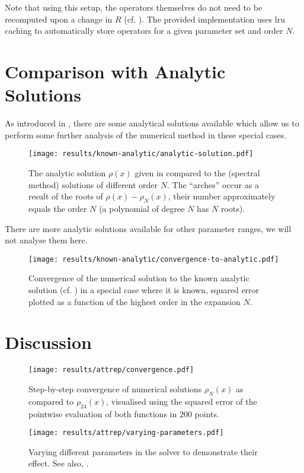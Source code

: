 Note that using this setup, the operators themselves do not need to be recomputed upon a change in $R$ (cf. ).
The provided implementation uses \gls{lru} caching to automatically store operators for a given parameter set and order $N$.

\section{Comparison with Analytic Solutions}
As introduced in , there are some analytical solutions available which allow us to perform some further analysis of the numerical method in these special cases.

\begin{figure}[H]
  \centering
  \label{fig:analytic-solution}
  \texttt{[image: results/known-analytic/analytic-solution.pdf]}
  \caption[Comparison with analytical solutions and error]{
    The analytic solution $\rho(x)$ given in  compared to the (spectral method) solutions of different order $N$.
    The ``arches'' occur as a result of the roots of $\rho(x) - \rho_N(x)$, their number approximately equals the order $N$ (a polynomial of degree $N$ has $N$ roots).
  }
\end{figure}

There are more analytic solutions available for other parameter ranges, we will not analyse them here.



\begin{figure}[H]
  \centering
  \label{fig:convergence-to-analytic}
  \texttt{[image: results/known-analytic/convergence-to-analytic.pdf]}
  \caption[Convergence to analytic solution]{Convergence of the numerical solution to the known analytic solution (cf. ) in a special case where it is known, squared error plotted as a function of the highest order in the expansion $N$.}
\end{figure}

\section{Discussion}
\begin{figure}[H]
  \centering
  \label{fig:convergence}
  \texttt{[image: results/attrep/convergence.pdf]}
  \caption[Step-by-step convergence of solutions compared to order 24]{Step-by-step convergence of numerical solutions $\rho_N(x)$ as compared to $\rho_{24}(x)$, visualised using the squared error of the pointwise evaluation of both functions in $200$ points.}
\end{figure}

\begin{figure}[H]
  \centering
  \label{fig:varying-parameters}
  \texttt{[image: results/attrep/varying-parameters.pdf]}
  \caption[Varying parameters in the solver]{
    Varying different parameters in the solver to demonstrate their effect.
    See also, .
  }
\end{figure}

